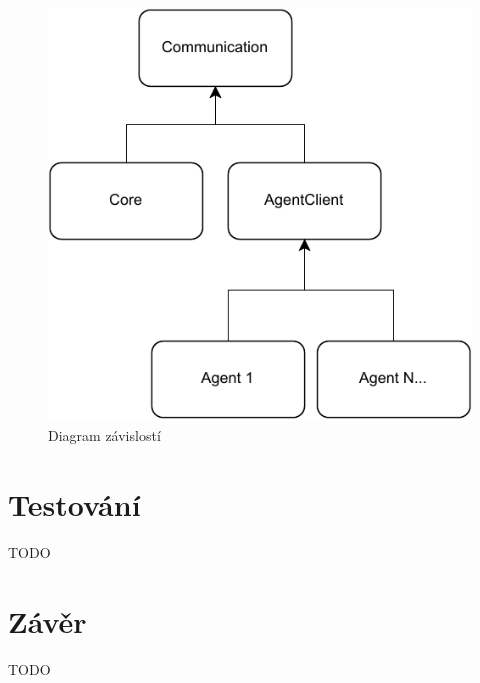\begin{figure}[hbt]
	\centering
	\includegraphics[width=\textwidth]{diagrams/dependency-diagram/dependency_diagram.pdf}
	\caption{Diagram závislostí}
\end{figure}

\chapter{Testování}
TODO

\chapter{Závěr}
TODO



